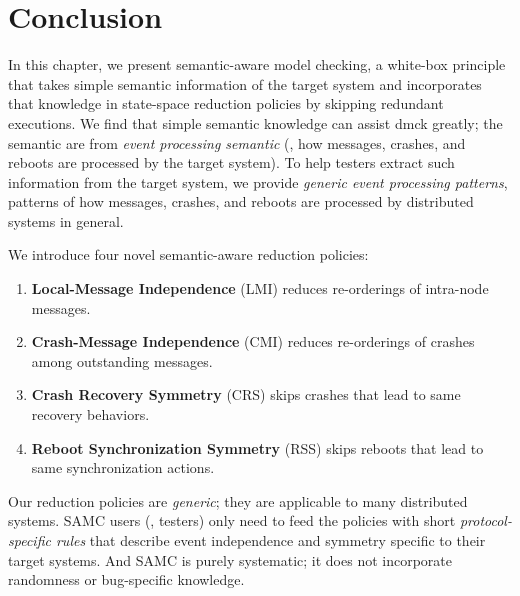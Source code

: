 \section{Conclusion}

In this chapter, we present semantic-aware model checking, a white-box principle
that takes simple semantic information of the target system and incorporates
that knowledge in state-space reduction policies by skipping redundant
executions. We find that simple semantic knowledge can assist dmck greatly; the
semantic are from \textit{event processing semantic} (\ie, how messages,
crashes, and reboots are processed by the target system). To help testers
extract such information from the target system, we provide \textit{generic
event processing patterns}, patterns of how messages, crashes, and reboots are
processed by distributed systems in general.

We introduce four novel semantic-aware reduction policies: 
\begin{enumerate}

\item {\bf Local-Message Independence} (LMI) reduces re-orderings of intra-node
messages. 

\item {\bf Crash-Message Independence} (CMI) reduces re-orderings of crashes
among outstanding messages.  

\item {\bf Crash Recovery Symmetry} (CRS) skips crashes that lead to same
recovery behaviors.

\item {\bf Reboot Synchronization Symmetry} (RSS) skips reboots that lead to
same synchronization actions.  

\end{enumerate}
Our reduction policies are {\em generic}; they are applicable to many
distributed systems. SAMC users (\ie, testers) only need to feed the policies
with short {\em protocol-specific rules} that describe event independence and
symmetry specific to their target systems. And SAMC is purely systematic; it
does not incorporate randomness or bug-specific knowledge.

